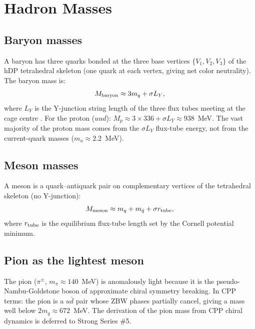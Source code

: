 \documentclass[11pt,a4paper]{article}
\begin{document}
\section{Hadron Masses}
\label{sec:hadrons}

\subsection{Baryon masses}

A baryon has three quarks bonded at the three base vertices
$\{V_1, V_2, V_3\}$ of the hDP tetrahedral skeleton (one quark
at each vertex, giving net color neutrality).  The baryon mass is:
\begin{equation}
M_{\rm baryon} \approx 3m_q + \sigma L_Y,
\label{eq:baryon}
\end{equation}
where $L_Y$ is the Y-junction string length of the three flux tubes
meeting at the cage centre \citep{c14}.  For the proton
($uud$): $M_p \approx 3\times336 + \sigma L_Y \approx 938$~MeV.
The vast majority of the proton mass comes from the $\sigma L_Y$
flux-tube energy, not from the current-quark masses
($m_u \approx 2.2$~MeV).

\subsection{Meson masses}

A meson is a quark--antiquark pair on complementary vertices of the
tetrahedral skeleton (no Y-junction):
\begin{equation}
M_{\rm meson} \approx m_q + m_{\bar q} + \sigma r_{\rm tube},
\label{eq:meson}
\end{equation}
where $r_{\rm tube}$ is the equilibrium flux-tube length set by the
Cornell potential minimum.

\subsection{Pion as the lightest meson}

The pion ($\pi^{\pm}$, $m_\pi \approx 140$~MeV) is anomalously
light because it is the pseudo-Nambu-Goldstone boson of approximate
chiral symmetry breaking.  In CPP terms: the pion is a $u\bar d$
pair whose ZBW phases partially cancel, giving a mass well below
$2m_q \approx 672$~MeV.  The derivation of the pion mass from
CPP chiral dynamics is deferred to Strong Series \#5.
\end{document}
